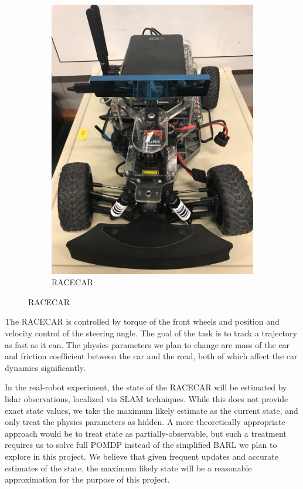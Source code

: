 \documentclass{article}
\begin{document}
\begin{figure}
\begin{subfigure}[b]{0.49\textwidth}
   \includegraphics[width=1\linewidth]{figs/racecar.jpg}
   \caption{RACECAR}
   \label{subfig:racecar}
 \end{subfigure}
 \label{fig:racecar}
\caption{RACECAR}
\end{figure}

The RACECAR is controlled by torque of the front wheels and position and velocity control of the steering angle. The goal of the task is to track a trajectory as fast as it can. The physics parameters we plan to change are mass of the car and friction coefficient between the car and the road, both of which affect the car dynamics significantly.

In the real-robot experiment, the state of the RACECAR will be estimated by lidar observations, localized via SLAM techniques. While this does not provide exact state values, we take the maximum likely estimate as the current state, and only treat the physics parameters as hidden. A more theoretically appropriate approach would be to treat state as partially-observable, but such a treatment requires us to solve full POMDP instead of the simplified BARL we plan to explore in this project. We believe that given frequent updates and accurate estimates of the state, the maximum likely state will be a reasonable approximation for the purpose of this project.
\end{document}
